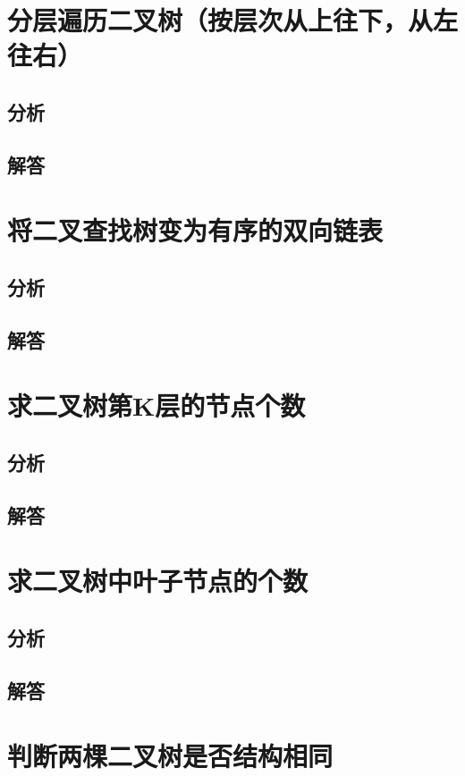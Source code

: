 \documentclass[UTF8,a4paper,12pt]{ctexbook}
\begin{document}
	
\section{分层遍历二叉树（按层次从上往下，从左往右）}
	\subsection{分析}
	
	\subsection{解答}
	
\section{将二叉查找树变为有序的双向链表}
	\subsection{分析}
	
	\subsection{解答}
	
\section{求二叉树第K层的节点个数}
	\subsection{分析}
	
	\subsection{解答}
	
	
\section{求二叉树中叶子节点的个数}
	\subsection{分析}
	
	\subsection{解答}
	
\section{判断两棵二叉树是否结构相同}
\end{document}
